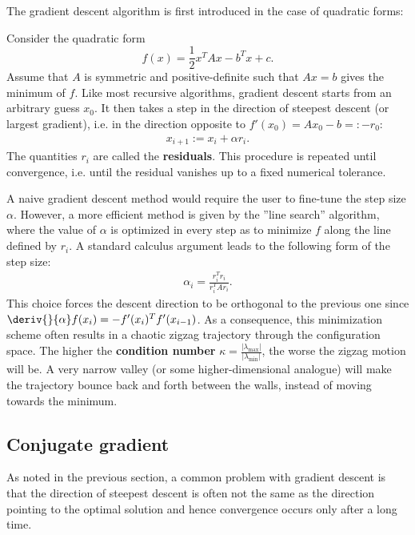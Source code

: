     The gradient descent algorithm is first introduced in the case of quadratic forms:
    \begin{method}
        Consider the quadratic form \[f(x) = \frac{1}{2}x^TAx - b^Tx + c.\] Assume that $A$ is symmetric and positive-definite such that $Ax=b$ gives the minimum of $f$. Like most recursive algorithms, gradient descent starts from an arbitrary guess $x_0$. It then takes a step in the direction of steepest descent (or largest gradient), i.e. in the direction opposite to $f'(x_0) = Ax_0-b =: -r_0$:
        \begin{gather}
            x_{i+1} := x_i + \alpha r_i.
        \end{gather}
        The quantities $r_i$ are called the \textbf{residuals}. This procedure is repeated until convergence, i.e. until the residual vanishes up to a fixed numerical tolerance.

        A naive gradient descent method would require the user to fine-tune the step size $\alpha$. However, a more efficient method is given by the ''line search'' algorithm, where the value of $\alpha$ is optimized in every step as to minimize $f$ along the line defined by $r_i$. A standard calculus argument leads to the following form of the step size:
        \begin{gather}
            \alpha_i = \frac{r_i^Tr_i}{r_i^TAr_i}.
        \end{gather}
        This choice forces the descent direction to be orthogonal to the previous one since $\deriv{}{\alpha}f(x_i) = -f'(x_i)^Tf'(x_{i-1})$. As a consequence, this minimization scheme often results in a chaotic zigzag trajectory through the configuration space. The higher the \textbf{condition number} $\kappa=\frac{|\lambda_\text{max}|}{|\lambda_\text{min}|}$, the worse the zigzag motion will be. A very narrow valley (or some higher-dimensional analogue) will make the trajectory bounce back and forth between the walls, instead of moving towards the minimum.
    \end{method}

\subsection{Conjugate gradient}

    As noted in the previous section, a common problem with gradient descent is that the direction of steepest descent is often not the same as the direction pointing to the optimal solution and hence convergence occurs only after a long time.

